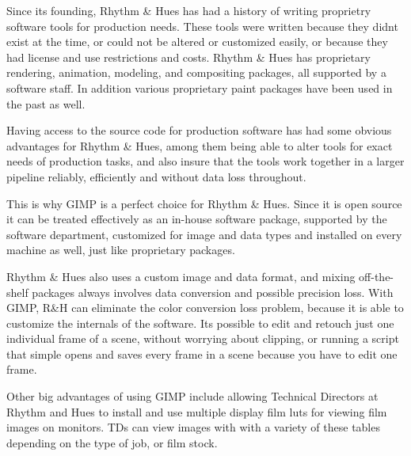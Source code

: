Since its founding, Rhythm \& Hues has had a history of writing proprietry
software tools for production needs. These tools were written because they
didnt exist at the time, or could not be altered or customized easily, or
because they had license and use restrictions and costs. Rhythm \& Hues has
proprietary rendering, animation, modeling, and compositing packages, all
supported by a software staff. In addition various proprietary paint packages
have been used in the past as well.

Having access to the source code for production software has had some obvious
advantages for Rhythm \& Hues, among them being able to alter tools for exact
needs of production tasks, and also insure that the tools work together in a
larger pipeline reliably, efficiently and without data loss throughout.

This is why GIMP is a perfect choice for Rhythm \& Hues. Since it is open
source it can be treated effectively as an in-house software package, supported
by the software department, customized for image and data types and installed
on every machine as well, just like proprietary packages.

Rhythm \& Hues also uses a custom image and data format, and mixing
off-the-shelf packages always involves data conversion and possible precision
loss. With GIMP, R\&H can eliminate the color conversion loss problem, because
it is able to customize the internals of the software. Its possible to edit and
retouch just one individual frame of a scene, without worrying about clipping,
or running a script that simple opens and saves every frame in a scene because
you have to edit one frame.

Other big advantages of using GIMP include allowing Technical Directors at
Rhythm and Hues to install and use multiple display film luts for viewing film
images on monitors. TDs can view images with with a variety of these tables
depending on the type of job, or film stock.
